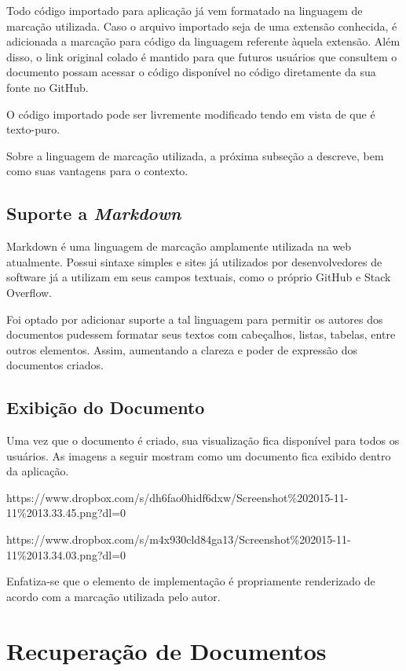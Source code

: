 Todo código importado para aplicação já vem formatado na linguagem de marcação utilizada. Caso o arquivo importado seja de uma extensão conhecida, é adicionada a marcação para código da linguagem referente àquela extensão. Além disso, o link original colado é mantido para que futuros usuários que consultem o documento possam acessar o código disponível no código diretamente da sua fonte no GitHub.

O código importado pode ser livremente modificado tendo em vista de que é texto-puro.


Sobre a linguagem de marcação utilizada, a próxima subseção a descreve, bem como suas vantagens para o contexto.

\subsection{Suporte a \textit{Markdown}}

Markdown é uma linguagem de marcação amplamente utilizada na web atualmente. Possui sintaxe simples e sites já utilizados por desenvolvedores de software já a utilizam em seus campos textuais, como o próprio GitHub e Stack Overflow.

Foi optado por adicionar suporte a tal linguagem para permitir os autores dos documentos pudessem formatar seus textos com cabeçalhos, listas, tabelas, entre outros elementos. Assim, aumentando a clareza e poder de expressão dos documentos criados.

\subsection{Exibição do Documento}

Uma vez que o documento é criado, sua visualização fica disponível para todos os usuários. As imagens a seguir mostram como um documento fica exibido dentro da aplicação.

https://www.dropbox.com/s/dh6fao0hidf6dxw/Screenshot\%202015-11-11\%2013.33.45.png?dl=0

https://www.dropbox.com/s/m4x930cld84ga13/Screenshot\%202015-11-11\%2013.34.03.png?dl=0

Enfatiza-se que o elemento de implementação é propriamente renderizado de acordo com a marcação utilizada pelo autor.

\section{Recuperação de Documentos}

